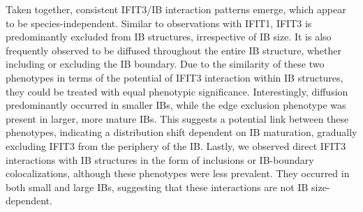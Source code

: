 Taken together, consistent IFIT3/IB interaction patterns emerge, which appear to be species-independent. Similar to observations with IFIT1, IFIT3 is predominantly excluded from IB structures, irrespective of IB size. It is also frequently observed to be diffused throughout the entire IB structure, whether including or excluding the IB boundary. Due to the similarity of these two phenotypes in terms of the potential of IFIT3 interaction within IB structures, they could be treated with equal phenotypic significance. Interestingly, diffusion predominantly occurred in smaller IBs, while the edge exclusion phenotype was present in larger, more mature IBs. This suggests a potential link between these phenotypes, indicating a distribution shift dependent on IB maturation, gradually excluding IFIT3 from the periphery of the IB. Lastly, we observed direct IFIT3 interactions with IB structures in the form of inclusions or IB-boundary colocalizations, although these phenotypes were less prevalent. They occurred in both small and large IBs, suggesting that these interactions are not IB size-dependent.

